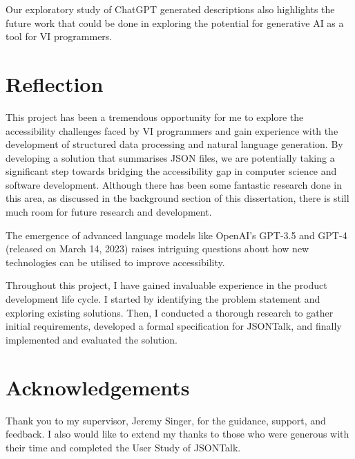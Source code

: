 \documentclass{l4proj}
\begin{document}
Our exploratory study of ChatGPT generated descriptions also highlights the future work that could be done in exploring the potential for generative AI as a tool for VI programmers.

\section{Reflection}

This project has been a tremendous opportunity for me to explore the accessibility challenges faced by VI programmers and gain experience with the development of structured data processing and natural language generation. By developing a solution that summarises JSON files, we are potentially taking a significant step towards bridging the accessibility gap in computer science and software development. Although there has been some fantastic research done in this area, as discussed in the background section of this dissertation, there is still much room for future research and development.

The emergence of advanced language models like OpenAI's GPT-3.5 and GPT-4 (released on March 14, 2023) raises intriguing questions about how new technologies can be utilised to improve accessibility.

Throughout this project, I have gained invaluable experience in the product development life cycle. I started by identifying the problem statement and exploring existing solutions. Then, I conducted a thorough research to gather initial requirements, developed a formal specification for JSONTalk, and finally implemented and evaluated the solution.

\section{Acknowledgements}

Thank you to my supervisor, Jeremy Singer, for the guidance, support, and feedback. I also would like to extend my thanks to those who were generous with their time and completed the User Study of JSONTalk.

%
% 
\end{document}
